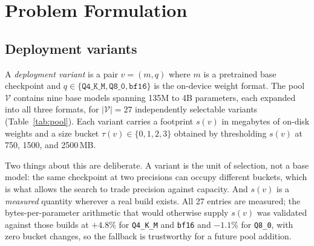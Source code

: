 \documentclass[sigconf,10pt]{acmart}
\begin{document}
\section{Problem Formulation}
\label{sec:formulation}

\subsection{Deployment variants}

A \emph{deployment variant} is a pair $v = (m, q)$ where $m$ is a pretrained base checkpoint
and $q \in \{\texttt{Q4\_K\_M}, \texttt{Q8\_0}, \texttt{bf16}\}$ is the on-device weight
format. The pool $\mathcal{V}$ contains nine base models spanning 135M to 4B parameters,
each expanded into all three formats, for $|\mathcal{V}| = 27$ independently selectable
variants (Table~\ref{tab:pool}). Each variant carries a footprint $s(v)$ in megabytes of
on-disk weights and a size bucket $\tau(v) \in \{0,1,2,3\}$ obtained by thresholding $s(v)$
at 750, 1500, and 2500\,MB.

Two things about this are deliberate. A variant is the unit of selection, not a base model:
the same checkpoint at two precisions can occupy different buckets, which is what allows the
search to trade precision against capacity. And $s(v)$ is a \emph{measured} quantity wherever
a real build exists. All 27 entries are measured; the bytes-per-parameter arithmetic that
would otherwise supply $s(v)$ was validated against those builds at $+4.8\%$ for
\texttt{Q4\_K\_M} and \texttt{bf16} and $-1.1\%$ for \texttt{Q8\_0}, with zero bucket changes,
so the fallback is trustworthy for a future pool addition.
\end{document}
